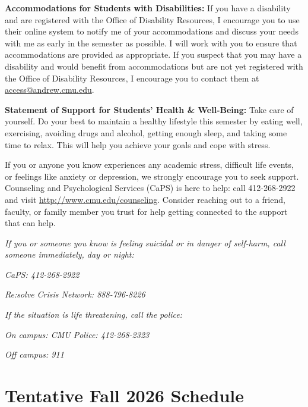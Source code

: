 \documentclass[11pt,letterpaper]{article}
\begin{document}
\medskip
\noindent
\textbf{Accommodations for Students with Disabilities:} If you have a disability and are registered with the Office of Disability Resources, I encourage you to use their online system to notify me of your accommodations and discuss your needs with me as early in the semester as possible. I will work with you to ensure that accommodations are provided as appropriate. If you suspect that you may have a disability and would benefit from accommodations but are not yet registered with the Office of Disability Resources, I encourage you to contact them at \href{mailto:access@andrew.cmu.edu}{access@andrew.cmu.edu}.

\medskip
\noindent
\textbf{Statement of Support for Students' Health \& Well-Being:} Take care of yourself. Do your best to maintain a healthy lifestyle this semester by eating well, exercising, avoiding drugs and alcohol, getting enough sleep, and taking some time to relax. This will help you achieve your goals and cope with stress.

\medskip
\noindent
If you or anyone you know experiences any academic stress, difficult life events, or feelings like anxiety or depression, we strongly encourage you to seek support. Counseling and Psychological Services (CaPS) is here to help: call 412-268-2922 and visit \href{http://www.cmu.edu/counseling}{http://www.cmu.edu/counseling}. Consider reaching out to a friend, faculty, or family member you trust for help getting connected to the support that can help.

\medskip
\noindent
\textit{If you or someone you know is feeling suicidal or in danger of self-harm, call someone immediately, day or night:}

\textit{CaPS: 412-268-2922}

\textit{Re:solve Crisis Network: 888-796-8226}

\medskip
\noindent
\textit{If the situation is life threatening, call the police:}

\textit{On campus: CMU Police: 412-268-2323}

\textit{Off campus: 911}


\section*{Tentative Fall 2026 Schedule}
\end{document}
